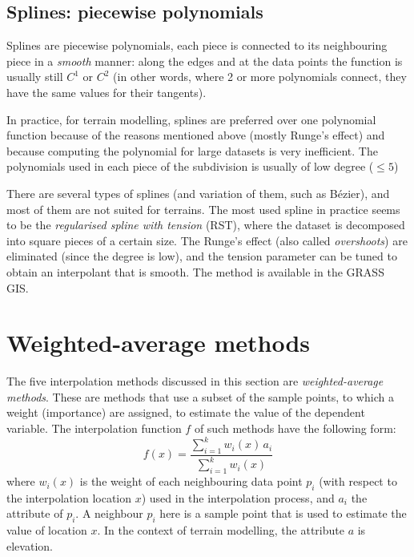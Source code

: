 %
\subsection{Splines: piecewise polynomials}

Splines are piecewise polynomials, each piece is connected to its neighbouring piece in a \emph{smooth} manner: along the edges and at the data points the function is usually still $C^1$ or $C^2$ (in other words, where 2 or more polynomials connect, they have the same values for their tangents).

In practice, for terrain modelling, splines are preferred over one polynomial function because of the reasons mentioned above (mostly Runge's effect) and because computing the polynomial for large datasets is very inefficient.
The polynomials used in each piece of the subdivision is usually of low degree ($\leq 5$)

%

There are several types of splines (and variation of them, such as Bézier), and most of them are not suited for terrains.
The most used spline in practice seems to be the \emph{regularised spline with tension} (RST), where the dataset is decomposed into square pieces of a certain size.
The Runge's effect (also called \emph{overshoots}) are eliminated (since the degree is low), and the tension parameter can be tuned to obtain an interpolant that is smooth.
The method is available in the GRASS GIS\@.



\section{Weighted-average methods}

The five interpolation methods discussed in this section are \emph{weighted-average methods}.
These are methods that use a subset of the sample points, to which a weight (importance) are assigned, to estimate the value of the dependent variable. 
The interpolation function $f$ of such methods have the following form:
\begin{equation}
  f(x) = \frac{\sum_{i=1}^{k} w_{i}(x) \, a_{i}}{\sum_{i=1}^{k} w_{i}(x)}
  \label{eq:wai}
\end{equation}
where $w_{i}(x)$ is the weight of each neighbouring data point $p_i$ (with respect to the interpolation location $x$) used in the interpolation process, and $a_i$ the attribute of $p_i$. 
A neighbour $p_i$ here is a sample point that is used to estimate the value of location $x$.
In the context of terrain modelling, the attribute $a$ is elevation.


